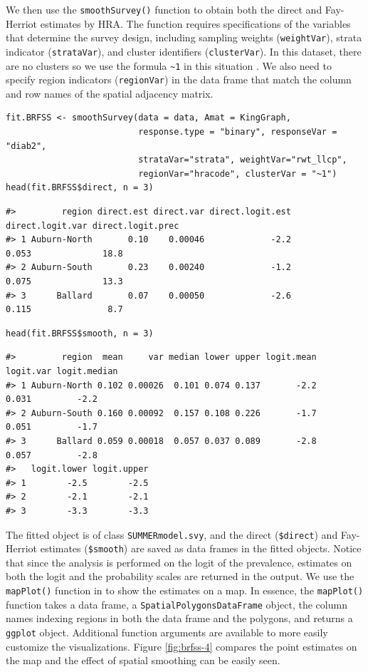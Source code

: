 We then use the \texttt{smoothSurvey()} function to obtain both the direct and Fay-Herriot estimates by HRA. The function requires specifications of the variables that determine the survey design, including sampling weights (\texttt{weightVar}), strata indicator (\texttt{strataVar}), and cluster identifiers (\texttt{clusterVar}). In this dataset, there are no clusters so we use the formula \texttt{\textasciitilde{}1} in this situation \citep{lumley2004analysis}. We also need to specify region indicators (\texttt{regionVar}) in the data frame that match the column and row names of the spatial adjacency matrix.

\begin{verbatim}
fit.BRFSS <- smoothSurvey(data = data, Amat = KingGraph, 
                          response.type = "binary", responseVar = "diab2", 
                          strataVar="strata", weightVar="rwt_llcp", 
                          regionVar="hracode", clusterVar = "~1")
head(fit.BRFSS$direct, n = 3)
\end{verbatim}

\begin{verbatim}
#>         region direct.est direct.var direct.logit.est direct.logit.var direct.logit.prec
#> 1 Auburn-North       0.10    0.00046             -2.2            0.053              18.8
#> 2 Auburn-South       0.23    0.00240             -1.2            0.075              13.3
#> 3      Ballard       0.07    0.00050             -2.6            0.115               8.7
\end{verbatim}

\begin{verbatim}
head(fit.BRFSS$smooth, n = 3)
\end{verbatim}

\begin{verbatim}
#>         region  mean     var median lower upper logit.mean logit.var logit.median
#> 1 Auburn-North 0.102 0.00026  0.101 0.074 0.137       -2.2     0.031         -2.2
#> 2 Auburn-South 0.160 0.00092  0.157 0.108 0.226       -1.7     0.051         -1.7
#> 3      Ballard 0.059 0.00018  0.057 0.037 0.089       -2.8     0.057         -2.8
#>   logit.lower logit.upper
#> 1        -2.5        -2.5
#> 2        -2.1        -2.1
#> 3        -3.3        -3.3
\end{verbatim}

The fitted object is of class \texttt{SUMMERmodel.svy}, and the direct (\texttt{\$direct}) and Fay-Herriot estimates (\texttt{\$smooth}) are saved as data frames in the fitted objects. Notice that since the analysis is performed on the logit of the prevalence, estimates on both the logit and the probability scales are returned in the output. We use the \texttt{mapPlot()} function in  to show the estimates on a map. In essence, the \texttt{mapPlot()} function takes a data frame, a \texttt{SpatialPolygonsDataFrame} object, the column names indexing regions in both the data frame and the polygons, and returns a \texttt{ggplot} object. Additional function arguments are available to more easily customize the visualizations. Figure \ref{fig:brfss-4} compares the point estimates on the map and the effect of spatial smoothing can be easily seen.

